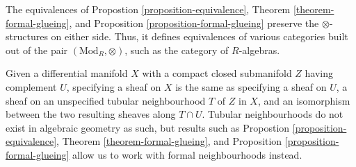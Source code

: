 \begin{remark}
\label{remark-formal-glueing-algebras}
The equivalences of
Propostion \ref{proposition-equivalence},
Theorem \ref{theorem-formal-glueing}, and
Proposition \ref{proposition-formal-glueing}
preserve the $\otimes$-structures on either side.
Thus, it defines equivalences of various categories
built out of the pair $(\text{Mod}_R,\otimes)$, such as the category of 
$R$-algebras.
\end{remark}

\begin{remark}
\label{remark-topological-analogue}
Given a differential manifold $X$ with a compact closed submanifold $Z$
having complement $U$, specifying a sheaf on $X$ is the same as specifying 
a sheaf on $U$, a sheaf on an unspecified tubular neighbourhood $T$ of $Z$ in 
$X$, and an isomorphism between the two resulting sheaves along $T \cap U$.
Tubular neighbourhoods do not exist in algebraic geometry as such, but
results such as
Propostion \ref{proposition-equivalence},
Theorem \ref{theorem-formal-glueing}, and
Proposition \ref{proposition-formal-glueing}
allow us to work with formal neighbourhoods instead.
\end{remark}









